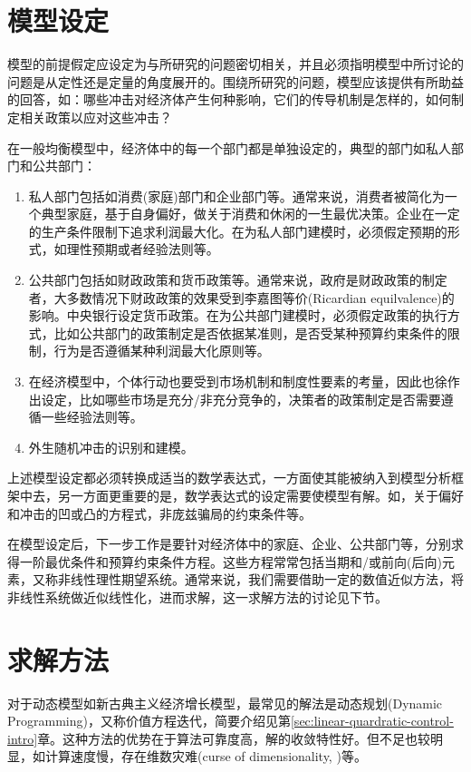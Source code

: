 \section{模型设定}
模型的前提假定应设定为与所研究的问题密切相关，并且必须指明模型中所讨论的问题是从定性还是定量的角度展开的。围绕所研究的问题，模型应该提供有所助益的回答，如：哪些冲击对经济体产生何种影响，它们的传导机制是怎样的，如何制定相关政策以应对这些冲击？

在一般均衡模型中，经济体中的每一个部门都是单独设定的，典型的部门如私人部门和公共部门：
\begin{enumerate}
  \item 私人部门包括如消费(家庭)部门和企业部门等。通常来说，消费者被简化为一个典型家庭，基于自身偏好，做关于消费和休闲的一生最优决策\citep{Christiano:2010wla}。企业在一定的生产条件限制下追求利润最大化。在为私人部门建模时，必须假定预期的形式，如理性预期或者经验法则等。
  \item 公共部门包括如财政政策和货币政策等。通常来说，政府是财政政策的制定者，大多数情况下财政政策的效果受到李嘉图等价(Ricardian equilvalence)的影响。中央银行设定货币政策。在为公共部门建模时，必须假定政策的执行方式，比如公共部门的政策制定是否依据某准则，是否受某种预算约束条件的限制，行为是否遵循某种利润最大化原则等。
  \item 在经济模型中，个体行动也要受到市场机制和制度性要素的考量，因此也徐作出设定，比如哪些市场是充分/非充分竞争的，决策者的政策制定是否需要遵循一些经验法则等。
  \item 外生随机冲击的识别和建模。
\end{enumerate}
上述模型设定都必须转换成适当的数学表达式，一方面使其能被纳入到模型分析框架中去，另一方面更重要的是，数学表达式的设定需要使模型有解。如，关于偏好和冲击的凹或凸的方程式，非庞兹骗局的约束条件等。

在模型设定后，下一步工作是要针对经济体中的家庭、企业、公共部门等，分别求得一阶最优条件和预算约束条件方程。这些方程常常包括当期和/或前向(后向)元素，又称非线性理性期望系统。通常来说，我们需要借助一定的数值近似方法，将非线性系统做近似线性化，进而求解，这一求解方法的讨论见下节。

\section{求解方法}
对于动态模型如新古典主义经济增长模型，最常见的解法是动态规划(Dynamic Programming)，又称价值方程迭代，简要介绍见第\ref{sec:linear-quardratic-control-intro}章。这种方法的优势在于算法可靠度高，解的收敛特性好。但不足也较明显，如计算速度慢，存在维数灾难(curse of dimensionality, \cite{Bellman:1957tx})等。

